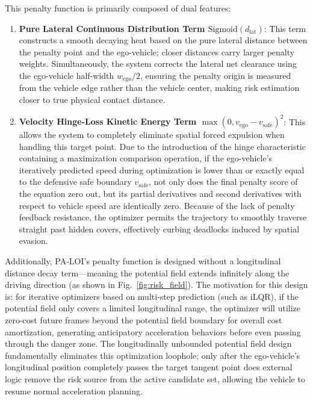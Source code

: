 \documentclass[conference]{IEEEtran}
\begin{document}
This penalty function is primarily composed of dual features:
\begin{enumerate}
    \item \textbf{Pure Lateral Continuous Distribution Term $\text{Sigmoid}(d_{\text{lat}})$}: This term constructs a smooth decaying heat based on the pure lateral distance between the penalty point and the ego-vehicle; closer distances carry larger penalty weights. Simultaneously, the system corrects the lateral net clearance using the ego-vehicle half-width $w_{\text{ego}}/2$, ensuring the penalty origin is measured from the vehicle edge rather than the vehicle center, making risk estimation closer to true physical contact distance.
    \item \textbf{Velocity Hinge-Loss Kinetic Energy Term $ \max(0, v_{\text{ego}} - v_{\text{safe}})^2$}: This allows the system to completely eliminate spatial forced expulsion when handling this target point. Due to the introduction of the hinge characteristic containing a maximization comparison operation, if the ego-vehicle's iteratively predicted speed during optimization is lower than or exactly equal to the defensive safe boundary $v_{\text{safe}}$, not only does the final penalty score of the equation zero out, but its partial derivatives and second derivatives with respect to vehicle speed are identically zero. Because of the lack of penalty feedback resistance, the optimizer permits the trajectory to smoothly traverse straight past hidden covers, effectively curbing deadlocks induced by spatial evasion.
\end{enumerate}

Additionally, PA-LOI's penalty function is designed without a longitudinal distance decay term---meaning the potential field extends infinitely along the driving direction (as shown in Fig.~\ref{fig:risk_field}). The motivation for this design is: for iterative optimizers based on multi-step prediction (such as iLQR), if the potential field only covers a limited longitudinal range, the optimizer will utilize zero-cost future frames beyond the potential field boundary for overall cost amortization, generating anticipatory acceleration behaviors before even passing through the danger zone. The longitudinally unbounded potential field design fundamentally eliminates this optimization loophole; only after the ego-vehicle's longitudinal position completely passes the target tangent point does external logic remove the risk source from the active candidate set, allowing the vehicle to resume normal acceleration planning.
\end{document}
